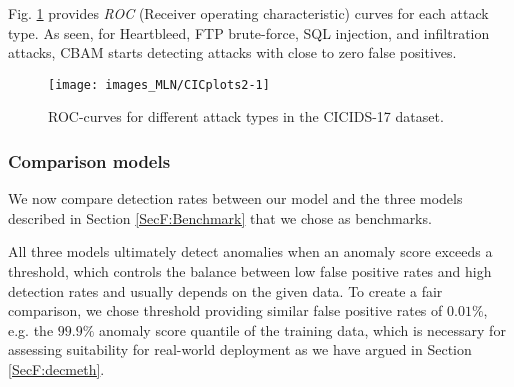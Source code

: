 Fig. \ref{figF:CICplots2} provides \emph{ROC} (Receiver operating characteristic) curves for each attack type. As seen, for Heartbleed, FTP brute-force, SQL injection, and infiltration attacks, CBAM starts detecting attacks with close to zero false positives.


\begin{figure}[ht]
\centering
\texttt{[image: images\_MLN/CICplots2-1]} 
\vspace{-0.5cm}
\caption[ROC-curves for different attack types.]{ROC-curves for different attack types in the CICIDS-17 dataset.}\label{figF:CICplots2}
\end{figure}

\subsubsection{Comparison models}\label{Sect:Comp}


We now compare detection rates between our model and the three models described in Section \ref{SecF:Benchmark} that we chose as benchmarks.

All three models ultimately detect anomalies when an anomaly score exceeds a threshold, which controls the balance between low false positive rates and high detection rates and usually depends on the given data. To create a fair comparison, we chose threshold providing similar false positive rates of $0.01\%$, e.g. the $99.9\%$ anomaly score quantile of the training data, which is necessary for assessing suitability for real-world deployment as we have argued in Section \ref{SecF:decmeth}. 


